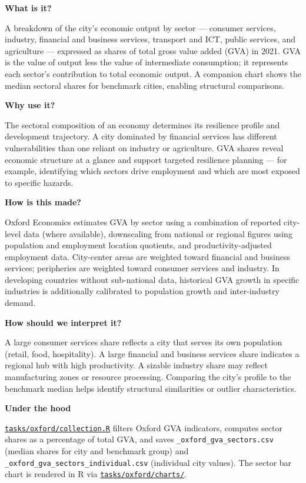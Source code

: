\documentclass[
  letterpaper,
  DIV=11,
  numbers=noendperiod]{scrreprt}
\begin{document}
\textbf{What is it?}

A breakdown of the city's economic output by sector --- consumer
services, industry, financial and business services, transport and ICT,
public services, and agriculture --- expressed as shares of total gross
value added (GVA) in 2021. GVA is the value of output less the value of
intermediate consumption; it represents each sector's contribution to
total economic output. A companion chart shows the median sectoral
shares for benchmark cities, enabling structural comparisons.

\textbf{Why use it?}

The sectoral composition of an economy determines its resilience profile
and development trajectory. A city dominated by financial services has
different vulnerabilities than one reliant on industry or agriculture.
GVA shares reveal economic structure at a glance and support targeted
resilience planning --- for example, identifying which sectors drive
employment and which are most exposed to specific hazards.

\textbf{How is this made?}

Oxford Economics estimates GVA by sector using a combination of reported
city-level data (where available), downscaling from national or regional
figures using population and employment location quotients, and
productivity-adjusted employment data. City-center areas are weighted
toward financial and business services; peripheries are weighted toward
consumer services and industry. In developing countries without
sub-national data, historical GVA growth in specific industries is
additionally calibrated to population growth and inter-industry demand.

\textbf{How should we interpret it?}

A large consumer services share reflects a city that serves its own
population (retail, food, hospitality). A large financial and business
services share indicates a regional hub with high productivity. A
sizable industry share may reflect manufacturing zones or resource
processing. Comparing the city's profile to the benchmark median helps
identify structural similarities or outlier characteristics.

\textbf{Under the hood}

\href{../tasks/oxford/collection.R}{\texttt{tasks/oxford/collection.R}}
filters Oxford GVA indicators, computes sector shares as a percentage of
total GVA, and saves \texttt{\_oxford\_gva\_sectors.csv} (median shares
for city and benchmark group) and
\texttt{\_oxford\_gva\_sectors\_individual.csv} (individual city
values). The sector bar chart is rendered in R via
\href{../tasks/oxford/charts/}{\texttt{tasks/oxford/charts/}}.
\end{document}

